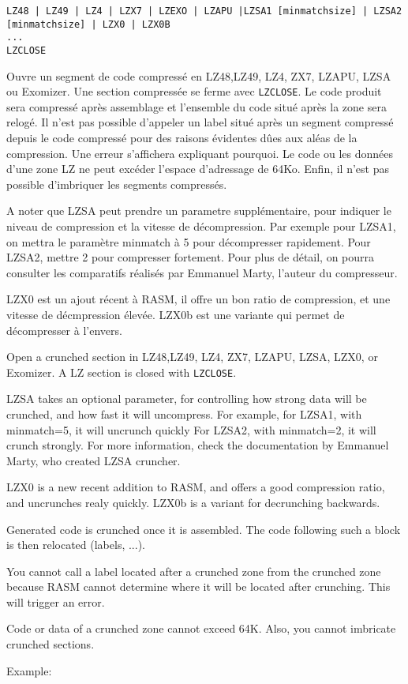 \subsubsection{}
\begin{verbatim}
LZ48 | LZ49 | LZ4 | LZX7 | LZEXO | LZAPU |LZSA1 [minmatchsize] | LZSA2 [minmatchsize] | LZX0 | LZX0B
...
LZCLOSE
\end{verbatim}

\begin{xfr}
Ouvre un segment de code compressé en LZ48,LZ49, LZ4, ZX7, LZAPU, LZSA ou Exomizer. Une section compressée se ferme avec \texttt{LZCLOSE}.
Le code produit sera compressé après assemblage et l'ensemble du code situé après la zone sera relogé.
Il n'est pas possible d'appeler un label situé après un segment compressé depuis le code compressé pour des raisons évidentes dûes aux aléas de la compression. Une erreur s'affichera expliquant pourquoi.
Le code ou les données d'une zone LZ ne peut excéder l'espace d'adressage de 64Ko. Enfin, il n'est pas possible d'imbriquer les segments compressés.

A noter que LZSA peut prendre un parametre supplémentaire, pour indiquer le niveau de compression et la vitesse de décompression.
Par exemple pour LZSA1, on mettra le paramètre minmatch à 5 pour décompresser rapidement.
Pour LZSA2, mettre 2 pour compresser fortement. Pour plus de détail, on pourra consulter les comparatifs réalisés par Emmanuel Marty, l'auteur du compresseur.

LZX0 est un ajout récent à RASM, il offre un bon ratio de compression, et une vitesse de décmpression élevée.
LZX0b est une variante qui permet de décompresser à l'envers. 

\end{xfr}

\begin{xen}
Open a crunched section in LZ48,LZ49, LZ4, ZX7, LZAPU, LZSA, LZX0, or Exomizer. A LZ section is closed with \texttt{LZCLOSE}.

LZSA takes an optional parameter, for controlling how strong data will be crunched, and how fast it will uncompress.
For example, for LZSA1, with minmatch=5, it will uncrunch quickly
For LZSA2, with minmatch=2, it will crunch strongly.
For more information, check the documentation by Emmanuel Marty, who created LZSA cruncher.

LZX0 is a new recent addition to RASM, and offers a good compression ratio, and uncrunches realy quickly.
LZX0b is a variant for decrunching backwards.

Generated code is crunched once it is assembled. The code following such a block is then relocated (labels, ...).


You cannot call a label located after a crunched zone from the crunched zone because RASM cannot determine where it will be located after crunching. This will trigger an error.

Code or data of a crunched zone cannot exceed 64K.  Also, you cannot imbricate crunched sections.

Example:
\end{xen}


